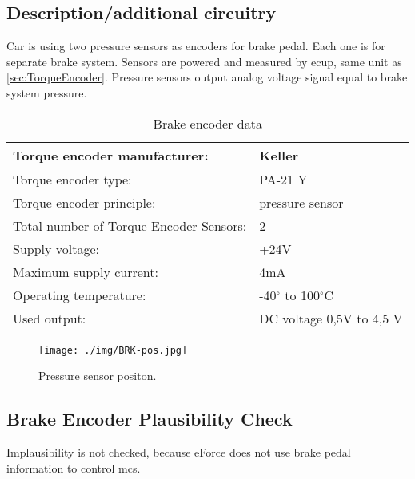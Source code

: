 \subsection{Description/additional circuitry}
Car is using two pressure sensors as encoders for brake pedal. Each one is for separate brake system. Sensors are powered and measured by \gls{ecup}, same unit as \ref{sec:TorqueEncoder}. Pressure sensors output analog voltage signal equal to brake system pressure. 


\begin{table}[H]
	\centering
	\caption{Brake encoder data}
	\begin{tabularx}{\textwidth}{|X|X|}
		\hline
		Torque encoder manufacturer: &  Keller \\[\TableSize]\hline
		Torque encoder type: & PA-21 Y \\[\TableSize]\hline
		Torque encoder principle: & pressure sensor \\[\TableSize]\hline
		Total number of Torque Encoder Sensors: & 2 \\[\TableSize]\hline
		Supply voltage: & +24V \\[\TableSize]\hline
		Maximum supply current: &  4mA  \\[\TableSize]\hline
		Operating temperature: & -40$^\circ$ to 100$^\circ$C \\[\TableSize]\hline
		Used output: & DC voltage 0,5V to 4,5 V \\[\TableSize]\hline
	\end{tabularx}%
	\label{tab:brake-general}%
\end{table}%

\begin{figure}[H]
	\begin{center}
		\texttt{[image: ./img/BRK-pos.jpg]}
		\caption{Pressure sensor positon.}
		\label{fig:brake_pressure_position}
	\end{center}
\end{figure}

\subsection{Brake Encoder Plausibility Check}
Implausibility is not checked, because eForce does not use brake pedal information to control \glspl{mc}.

%
%




